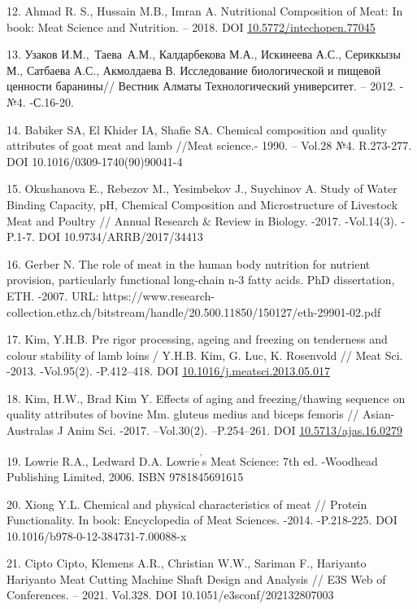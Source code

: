 \begin{references}
12. Ahmad R. S., Hussain M.B., Imran A. Nutritional Composition of Meat:
In book: Meat Science and Nutrition. -- 2018. DOI
\href{http://dx.doi.org/10.5772/intechopen.77045}{10.5772/intechopen.77045}

13. Узаков И.М.,~Таева~А.М., Калдарбекова М.А., Искинеева А.С., Сериккызы
М., Сатбаева А.С., Акмолдаева В. Исследование биологической и пищевой
ценности баранины// Вестник Алматы Технологический университет. --
2012. - №4. -С.16-20.

14. Babiker SA, El Khider IA, Shafie SA. Chemical composition and quality
attributes of goat meat and lamb //Meat science.- 1990. -- Vol.28 №4.
R.273-277. DOI 10.1016/0309-1740(90)90041-4

15. Okushanova E., Rebezov M., Yesimbekov J., Suychinov A. Study of Water
Binding Capacity, pH, Chemical Composition and Microstructure of
Livestock Meat and Poultry // Annual Research \& Review in Biology.
-2017. -Vol.14(3). -P.1-7. DOI 10.9734/ARRB/2017/34413

16. Gerber N. The role of meat in the human body nutrition for nutrient
provision, particularly functional long-chain n-3 fatty acids. PhD
dissertation, ETH. -2007. URL:
https://www.research-collection.ethz.ch/bitstream/handle/20.500.11850/150127/eth-29901-02.pdf

17. Kim, Y.H.B. Pre rigor processing, ageing and freezing on tenderness
and colour stability of lamb loins / Y.H.B. Kim, G. Luc, K. Rosenvold
// Meat Sci. -2013. -Vol.95(2). -P.412--418. DOI
\href{http://dx.doi.org/10.1016/j.meatsci.2013.05.017}{10.1016/j.meatsci.2013.05.017}

18. Kim, H.W., Brad Kim Y. Effects of aging and freezing/thawing sequence
on quality attributes of bovine Mm. gluteus medius and biceps femoris
// Asian-Australas J Anim Sci. -2017. --Vol.30(2). --P.254--261. DOI
\href{http://dx.doi.org/10.5713/ajas.16.0279}{10.5713/ajas.16.0279}

19. Lowrie R.A., Ledward D.A. Lowrie\textsuperscript{'{}}s
Meat Science: 7th ed. -Woodhead Publishing Limited, 2006. ISBN
9781845691615

20. Xiong Y.L. Сhemical and physical characteristics of meat // Protein
Functionality. In book: Encyclopedia of Meat Sciences. -2014.
-P.218-225. DOI 10.1016/b978-0-12-384731-7.00088-x

21. Cipto Cipto, Klemens A.R., Christian W.W., Sariman F., Hariyanto
Hariyanto Meat Cutting Machine Shaft Design and Analysis // E3S Web of
Conferences. -- 2021. Vol.328. DOI 10.1051/e3sconf/202132807003


\end{references}
